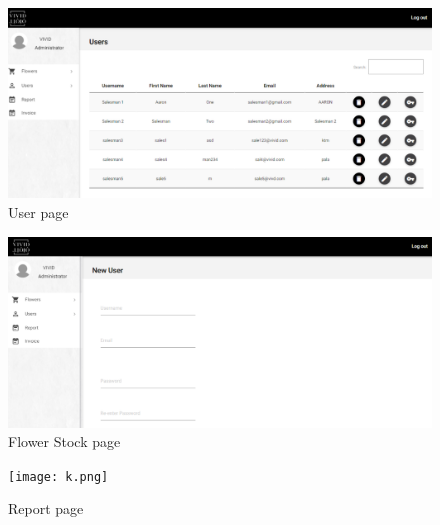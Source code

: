 \documentclass[a4paper,12pt]{article}
\begin{document}
\newpage
\begin{figure}[h!]
\centering\includegraphics[height=1.1\textwidth]{h.png}
\caption{ User page}
\end{figure}
\newpage
\begin{figure}[h!]
\centering\includegraphics[height=1.1\textwidth]{g.png}
\caption{Flower Stock page}
\end{figure}
\newpage
\begin{figure}[h!]
\centering\texttt{[image: k.png]}
\caption{Report page}
\end{figure}
\newpage 
\end{document}
